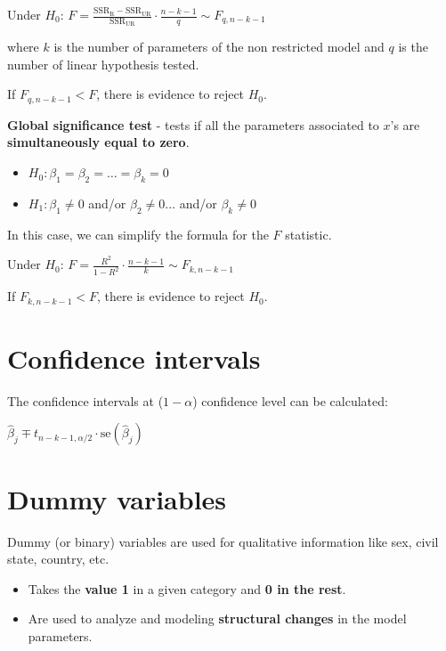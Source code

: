 \documentclass[10pt, a4paper, landscape]{extarticle}
\newcommand{\se}{\mathrm{se}}
\newcommand{\SSR}{\mathrm{SSR}}
\begin{document}
\begin{multicols}{3}
\begin{center}
	Under $H_0$: \quad $F = \frac{\SSR_\mathrm{R} - \SSR_\mathrm{UR}}{\SSR_\mathrm{UR}} \cdot \frac{n - k - 1}{q} \sim F_{q, n - k - 1}$
\end{center}

where $k$ is the number of parameters of the non restricted model and $q$ is the number of linear hypothesis tested.

If $F_{q, n - k - 1} < F$, there is evidence to reject $H_0$.

\textbf{Global significance test} - tests if all the parameters associated to $x$'s are \textbf{simultaneously equal to zero}.

\begin{itemize}[leftmargin=*]
	\item $H_0: \beta_1 = \beta_2 = \ldots = \beta_k = 0$
	\item $H_1: \beta_1 \neq 0$ and/or $\beta_2 \neq 0 \ldots$ and/or $\beta_k \neq 0$
\end{itemize}

In this case, we can simplify the formula for the $F$ statistic.

\begin{center}
	Under $H_0$: \quad $F = \frac{R^2}{1 - R^2} \cdot \frac{n - k - 1}{k} \sim F_{k, n - k - 1}$
\end{center}

If $F_{k, n - k - 1} < F$, there is evidence to reject $H_0$.

\section*{Confidence intervals}

The confidence intervals at ($1 - \alpha$) confidence level can be calculated:

\begin{center}
	$\hat{\beta}_j \mp t_{n - k - 1, \alpha/2} \cdot \se(\hat{\beta}_j)$
\end{center}

\section*{Dummy variables}

Dummy (or binary) variables are used for qualitative information like sex, civil state, country, etc.

\begin{itemize}[leftmargin=*]
	\item Takes the \textbf{value 1} in a given category and \textbf{0 in the rest}.
	\item Are used to analyze and modeling \textbf{structural changes} in the model parameters.
\end{itemize}


\end{multicols}
\end{document}
